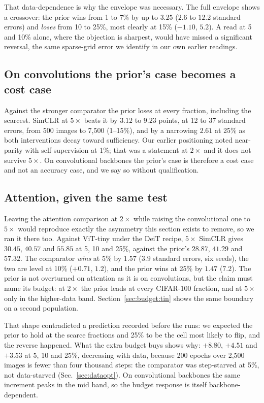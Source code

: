 That data-dependence is why the envelope was necessary. The full
envelope shows a crossover: the prior wins from 1 to 7\% by up to $3.25$ ($2.6$
to $12.2$ standard errors) and \emph{loses} from 10 to 25\%, most clearly at
15\% ($-1.10$, $5.2$). A read at 5 and 10\% alone, where the objection is
sharpest, would have missed a significant
reversal, the same sparse-grid error we identify in our own earlier readings.

\subsection{On convolutions the prior's case becomes a cost
case}\label{sec:budget:conv} Against the stronger comparator the prior loses at
every fraction, including the scarcest. SimCLR at $5\times$ beats it by $3.12$
to $9.23$ points, at 12 to 37 standard errors, from 500 images to 7{,}500
(1--15\%), and by a narrowing $2.61$ at 25\% as both interventions decay toward
sufficiency. Our earlier positioning noted near-parity with self-supervision at
1\%; that was a statement at $2\times$ and it does not survive $5\times$. On
convolutional backbones the prior's case is therefore a cost case and not an
accuracy case, and we say so without qualification.

\subsection{Attention, given the same test}\label{sec:budget:vit}
Leaving the attention comparison at $2\times$ while raising the convolutional
one to $5\times$ would reproduce exactly the asymmetry this section exists to
remove, so we ran it there too. Against ViT-tiny under the DeiT recipe,
$5\times$ SimCLR gives $30.45$, $40.57$ and $55.85$ at 5, 10 and 25\%, against
the prior's $28.87$, $41.29$ and $57.32$. The comparator \emph{wins} at 5\% by
$1.57$ ($3.9$ standard errors, six seeds), the two are level at 10\% ($+0.71$,
$1.2$), and the prior wins at 25\% by $1.47$ ($7.2$). The prior is not
overturned on attention as it is on convolutions, but the claim must name its
budget: at $2\times$ the prior leads at every CIFAR-100 fraction, and at
$5\times$ only in the higher-data band. Section~\ref{sec:budget:tin} shows the same boundary
on a second population.

That shape contradicted a prediction recorded before the runs: we expected the
prior to hold at the scarce fractions and 25\% to be the cell most likely to
flip, and the reverse happened. What the extra budget buys shows why: $+8.80$,
$+4.51$ and $+3.53$ at 5, 10 and 25\%, decreasing with data, because 200 epochs
over 2{,}500 images is fewer than four thousand steps: the comparator was
step-starved at 5\%, not data-starved (Sec.~\ref{sec:dataopt}). On
convolutional backbones the same increment peaks in the mid band, so the budget
response is itself backbone-dependent.

